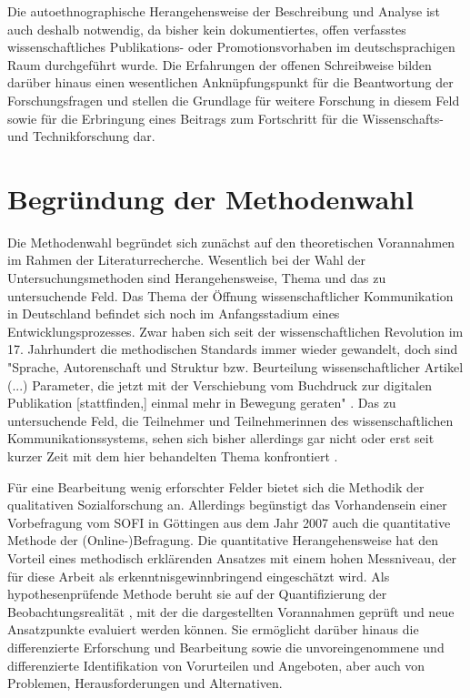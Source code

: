 Die autoethnographische Herangehensweise der Beschreibung und Analyse ist auch deshalb notwendig, da bisher kein dokumentiertes, offen verfasstes wissenschaftliches Publikations- oder Promotionsvorhaben im deutschsprachigen Raum durchgeführt wurde. Die Erfahrungen der offenen Schreibweise bilden darüber hinaus einen wesentlichen Anknüpfungspunkt für die Beantwortung der Forschungsfragen und stellen die Grundlage für weitere Forschung in diesem Feld sowie für die Erbringung eines Beitrags zum Fortschritt für die Wissenschafts- und Technikforschung dar.

\section{Begründung der Methodenwahl}

Die Methodenwahl begründet sich zunächst auf den theoretischen Vorannahmen im Rahmen der Literaturrecherche. Wesentlich bei der Wahl der Untersuchungsmethoden sind Herangehensweise, Thema und das zu untersuchende Feld. Das Thema der Öffnung wissenschaftlicher Kommunikation in Deutschland befindet sich noch im Anfangsstadium eines Entwicklungsprozesses. Zwar haben sich seit der wissenschaftlichen Revolution im 17. Jahrhundert die methodischen Standards immer wieder gewandelt, doch sind "Sprache, Autorenschaft und Struktur bzw. Beurteilung wissenschaftlicher Artikel (...) Parameter, die jetzt mit der Verschiebung vom Buchdruck zur digitalen Publikation [stattfinden,] einmal mehr in Bewegung geraten" \cite{Hagner_2015}. Das zu untersuchende Feld, die Teilnehmer und Teilnehmerinnen des wissenschaftlichen Kommunikationssystems, sehen sich bisher allerdings gar nicht oder erst seit kurzer Zeit mit dem hier behandelten Thema konfrontiert \cite{Hagner_2015}.

Für eine Bearbeitung wenig erforschter Felder bietet sich die Methodik der qualitativen Sozialforschung an. Allerdings begünstigt das Vorhandensein einer Vorbefragung vom SOFI in Göttingen aus dem Jahr 2007 auch die quantitative Methode der (Online-)Befragung. Die quantitative Herangehensweise hat den Vorteil eines methodisch erklärenden Ansatzes mit einem hohen Messniveau, der für diese Arbeit als erkenntnisgewinnbringend eingeschätzt wird. Als hypothesenprüfende Methode beruht sie auf der Quantifizierung der Beobachtungsrealität \cite{Bortz_2006b}, mit der die dargestellten Vorannahmen geprüft und neue Ansatzpunkte evaluiert werden können. Sie ermöglicht darüber hinaus die differenzierte Erforschung und Bearbeitung sowie die unvoreingenommene und differenzierte Identifikation von Vorurteilen und Angeboten, aber auch von Problemen, Herausforderungen und Alternativen.

